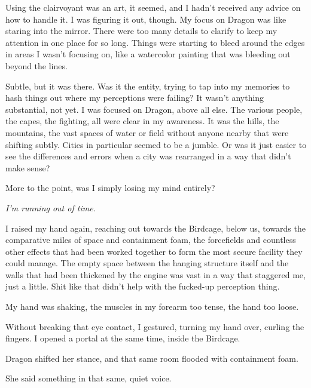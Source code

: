 Using the clairvoyant was an art, it seemed, and I hadn't received any advice on how to handle it.  I was figuring it out, though.  My focus on Dragon was like staring into the mirror.  There were too many details to clarify to keep my attention in one place for so long.  Things were starting to bleed around the edges in areas I wasn't focusing on, like a watercolor painting that was bleeding out beyond the lines.



Subtle, but it was there.  Was it the entity, trying to tap into my memories to hash things out where my perceptions were failing?  It wasn't anything substantial, not yet.  I was focused on Dragon, above all else.  The various people, the capes, the fighting, all were clear in my awareness.  It was the hills, the mountains, the vast spaces of water or field without anyone nearby that were shifting subtly.  Cities in particular seemed to be a jumble.  Or was it just easier to see the differences and errors when a city was rearranged in a way that didn't make sense?



More to the point, was I simply losing my mind entirely?



\emph{I'm running out of time.}



I raised my hand again, reaching out towards the Birdcage, below us, towards the comparative miles of space and containment foam, the forcefields and countless other effects that had been worked together to form the most secure facility they could manage.  The empty space between the hanging structure itself and the walls that had been thickened by the engine was vast in a way that staggered me, just a little.  Shit like that didn't help with the fucked-up perception thing.



My hand was shaking, the muscles in my forearm too tense, the hand too loose.



Without breaking that eye contact, I gestured, turning my hand over, curling the fingers.  I opened a portal at the same time, inside the Birdcage.



Dragon shifted her stance, and that same room flooded with containment foam.



She said something in that same, quiet voice.



